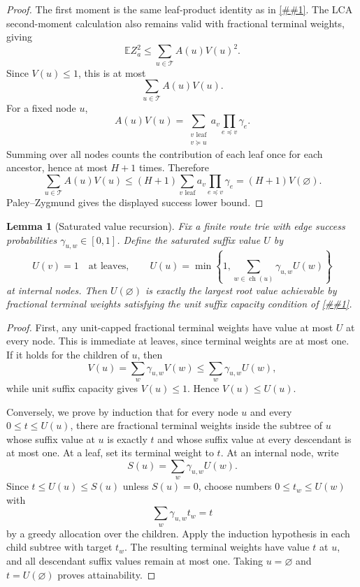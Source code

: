 \documentclass[10pt]{article}
\newcommand{\cref}[1]{\ref{##1}}
\newtheorem{lemma}[theorem]{Lemma}
\theoremstyle{definition}
\newcommand{\E}{\mathbb{E}}
\begin{document}
\begin{proof}
   The first moment is the same leaf-product identity as in
   \cref{lem:lca-value-flow}. The LCA second-moment calculation also remains
   valid with fractional terminal weights, giving
   \[
      \E Z_a^2
      \le
      \sum_{u\in\mathcal T} A(u)V(u)^2 .
   \]
   Since $V(u)\le1$, this is at most
   \[
      \sum_{u\in\mathcal T} A(u)V(u).
   \]
   For a fixed node $u$,
   \[
      A(u)V(u)
      =
      \sum_{\substack{v\text{ leaf}\\ v\succeq u}}
      a_v\prod_{e\preceq v}\gamma_e .
   \]
   Summing over all nodes counts the contribution of each leaf once for each
   ancestor, hence at most $H+1$ times. Therefore
   \[
      \sum_{u\in\mathcal T} A(u)V(u)
      \le
      (H+1)
      \sum_{v\text{ leaf}}a_v\prod_{e\preceq v}\gamma_e
      =
      (H+1)V(\varnothing).
   \]
   Paley--Zygmund gives the displayed success lower bound.
\end{proof}

\begin{lemma}[Saturated value recursion]\label{lem:saturated-value-recursion}
   Fix a finite route trie with edge success probabilities
   $\gamma_{u,w}\in[0,1]$. Define the saturated suffix value $U$ by
   \[
      U(v)=1\quad\text{at leaves},
      \qquad
      U(u)=
      \min\left\{1,\sum_{w\in\operatorname{ch}(u)}
      \gamma_{u,w}U(w)\right\}
   \]
   at internal nodes. Then $U(\varnothing)$ is exactly the largest root value
   achievable by fractional terminal weights satisfying the unit suffix
   capacity condition of \cref{lem:unit-capped-value-flow}.
\end{lemma}

\begin{proof}
   First, any unit-capped fractional terminal weights have value at most $U$ at
   every node. This is immediate at leaves, since terminal weights are at most
   one. If it holds for the children of $u$, then
   \[
      V(u)=\sum_w\gamma_{u,w}V(w)
      \le
      \sum_w\gamma_{u,w}U(w),
   \]
   while unit suffix capacity gives $V(u)\le1$. Hence $V(u)\le U(u)$.

   Conversely, we prove by induction that for every node $u$ and every
   $0\le t\le U(u)$, there are fractional terminal weights inside the subtree
   of $u$ whose suffix value at $u$ is exactly $t$ and whose suffix value at
   every descendant is at most one. At a leaf, set its terminal weight to $t$.
   At an internal node, write
   \[
      S(u)=\sum_w\gamma_{u,w}U(w).
   \]
   Since $t\le U(u)\le S(u)$ unless $S(u)=0$, choose numbers
   $0\le t_w\le U(w)$ with
   \[
      \sum_w\gamma_{u,w}t_w=t
   \]
   by a greedy allocation over the children. Apply the induction hypothesis in
   each child subtree with target $t_w$. The resulting terminal weights have
   value $t$ at $u$, and all descendant suffix values remain at most one.
   Taking $u=\varnothing$ and $t=U(\varnothing)$ proves attainability.
\end{proof}
\end{document}
